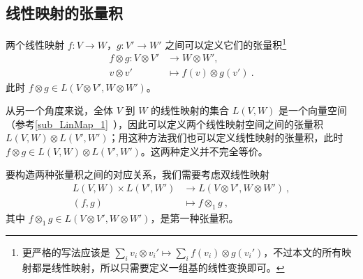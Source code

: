 
\begin{issues}
\issueDraft
{}
\end{issues}


\subsection{线性映射的张量积}

两个线性映射 $f: V \to W$，$g: V' \to W'$ 之间可以定义它们的张量积\footnote{更严格的写法应该是 $\sum_i v_i \otimes v_i' \mapsto \sum_i f(v_i) \otimes g(v_i')$，不过本文的所有映射都是线性映射，所以只需要定义一组基的线性变换即可。}
\begin{equation}
\begin{aligned}
f \otimes g: V \otimes V' &\to W \otimes W', \\
v \otimes v' &\mapsto f(v) \otimes g(v')~.
\end{aligned}
\end{equation}
此时 $f \otimes g \in L(V \otimes V', W \otimes W')$。




从另一个角度来说，全体 $V$ 到 $W$ 的线性映射的集合 $L(V, W)$ 是一个向量空间（参考\autoref{sub_LinMap_1}~），因此可以定义两个线性映射空间之间的张量积 $L(V, W) \otimes L(V', W')$；用这种方法我们也可以定义线性映射的张量积，此时 $f \otimes g \in L(V, W) \otimes L(V', W')$。这两种定义并不完全等价。


要构造两种张量积之间的对应关系，我们需要考虑双线性映射
\begin{equation}
\begin{aligned}
L(V, W) \times L(V', W') &\to L(V \otimes V', W \otimes W')~, \\
(f, g) &\mapsto f \otimes_1 g~,
\end{aligned}
\end{equation}
其中 $f \otimes_1 g \in L(V \otimes V', W \otimes W')$，是第一种张量积。


